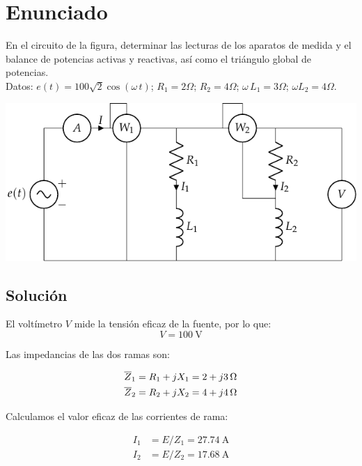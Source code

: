 \section{Enunciado}

En el circuito de la figura, determinar las lecturas de los aparatos de medida y el balance de potencias activas y reactivas, así como el triángulo global de potencias.\\
Datos: $e(t)=100\sqrt{2}\cos(\omega\,t)$; $R_1=2\Omega$;
$R_2=4\Omega$; $\omega\,L_1=3\Omega$; $\omega L_2=4\Omega$.

\begin{center}
  \includegraphics{figuras/BT2_11.pdf}
\end{center}

\subsection*{Solución}

El voltímetro $V$ mide la tensión eficaz de la fuente, por lo que:
\begin{equation*}
  V=\qty{100}{\volt}
\end{equation*}

Las impedancias de las dos ramas son:

\begin{align*}
  \overline{Z}_1 &= R_1 + jX_1 = \qty[parse-numbers=false]{2 + j3}{\ohm}\\
  \overline{Z}_2 &= R_2 + jX_2 = \qty[parse-numbers=false]{4 + j4}{\ohm}
\end{align*}

Calculamos el valor eficaz de las corrientes de rama:

\begin{align*}
  I_1 &= E/Z_1 = \qty{27.74}{\ampere}\\
  I_2 &= E/Z_2 = \qty{17.68}{\ampere}\\
\end{align*}

